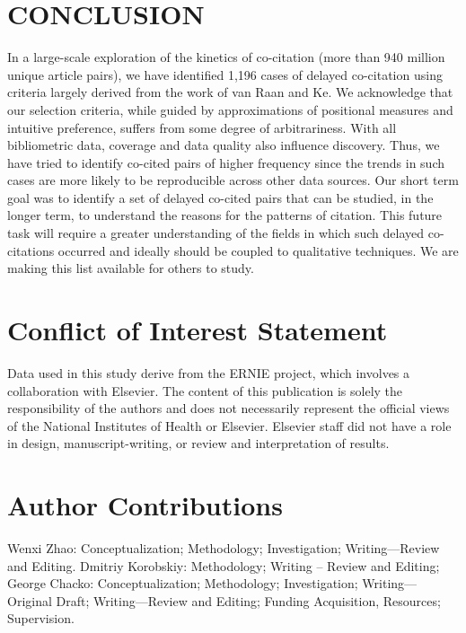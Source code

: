 \documentclass[utf8]{frontiersSCNS}
\begin{document}
\section{CONCLUSION} In a large-scale exploration of the kinetics of co-citation (more than 940 million unique article pairs), we have identified 1,196 cases of delayed co-citation using criteria largely derived from the work of van Raan and Ke. We acknowledge that our selection criteria, while guided by approximations of positional measures and intuitive preference, suffers from some degree of arbitrariness.  With all bibliometric data, coverage and data quality also influence discovery. Thus, we have tried to identify co-cited pairs of higher frequency since the trends in such cases are more likely to be reproducible across other data sources. Our short term goal was to identify a set of delayed co-cited pairs that can be studied, in the longer term, to understand the reasons for the patterns of citation. This future task will require a greater understanding of the fields in which such delayed co-citations occurred and ideally should be coupled to qualitative techniques. We are making this list available for others to study. 


\section*{Conflict of Interest Statement}
Data used in this study derive from the ERNIE project, which involves a collaboration with Elsevier. The content of this publication is solely the responsibility of the authors and does not necessarily represent the official views of the National Institutes of Health or Elsevier.  Elsevier staff did not have a role in design, manuscript-writing, or review and interpretation of results.

\section*{Author Contributions}

Wenxi Zhao: Conceptualization; Methodology; Investigation; Writing—Review and Editing. Dmitriy Korobskiy: Methodology; Writing – Review and Editing; George Chacko: Conceptualization; Methodology; Investigation; Writing—Original Draft; Writing—Review and Editing; Funding Acquisition, Resources; Supervision.
\end{document}
